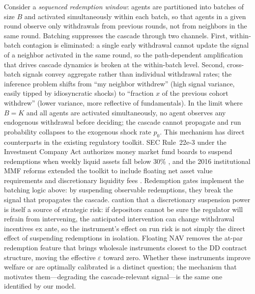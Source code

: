 \documentclass[12pt]{article}\usepackage[]{graphicx}\usepackage[]{xcolor}
\begin{document}
Consider a \textit{sequenced redemption window}: agents are partitioned into batches of size $B$ and activated simultaneously within each batch, so that agents in a given round observe only withdrawals from previous rounds, not from neighbors in the same round.
Batching suppresses the cascade through two channels.
First, within-batch contagion is eliminated: a single early withdrawal cannot update the signal of a neighbor activated in the same round, so the path-dependent amplification that drives cascade dynamics is broken at the within-batch level.
Second, cross-batch signals convey aggregate rather than individual withdrawal rates; the inference problem shifts from ``my neighbor withdrew'' (high signal variance, easily tipped by idiosyncratic shocks) to ``fraction $x$ of the previous cohort withdrew'' (lower variance, more reflective of fundamentals).
In the limit where $B = K$ and all agents are activated simultaneously, no agent observes any endogenous withdrawal before deciding; the cascade cannot propagate and run probability collapses to the exogenous shock rate $p_0$.
This mechanism has direct counterparts in the existing regulatory toolkit.
SEC Rule~22e-3 under the Investment Company Act authorizes money market fund boards to suspend redemptions when weekly liquid assets fall below 30\% \citep{sec_rule_22e3}, and the 2016 institutional MMF reforms extended the toolkit to include floating net asset value requirements and discretionary liquidity fees \citep{sec_mmf_reform_2016}.
Redemption gates implement the batching logic above: by suspending observable redemptions, they break the signal that propagates the cascade.
\citet{ennis2009institutions} caution that a discretionary suspension power is itself a source of strategic risk: if depositors cannot be sure the regulator will refrain from intervening, the anticipated intervention can change withdrawal incentives ex ante, so the instrument's effect on run risk is not simply the direct effect of suspending redemptions in isolation.
Floating NAV removes the at-par redemption feature that brings wholesale instruments closest to the DD contract structure, moving the effective $\varepsilon$ toward zero.
Whether these instruments improve welfare or are optimally calibrated is a distinct question; the mechanism that motivates them---degrading the cascade-relevant signal---is the same one identified by our model.
\end{document}
